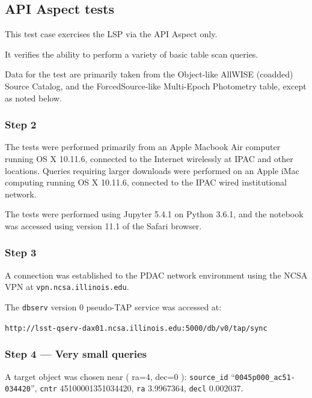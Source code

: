 
\subsection{API Aspect tests}

This test case exercises the LSP via the API Aspect only.

It verifies the ability to perform a variety of basic table scan queries.

Data for the test are primarily taken from the Object-like AllWISE (coadded) Source Catalog,
and the ForcedSource-like Multi-Epoch Photometry table,
except as noted below.

\subsubsection{Step 2}

The tests were performed primarily from an Apple Macbook Air computer running OS X 10.11.6,
connected to the Internet wirelessly at IPAC and other locations.
Queries requiring larger downloads were performed on an Apple iMac computing running OS X 10.11.6,
connected to the IPAC wired institutional network.

The tests were performed using Jupyter 5.4.1 on Python 3.6.1, and the notebook was accessed using version 11.1 of the Safari browser.

\subsubsection{Step 3}

A connection was established to the PDAC network environment using the NCSA VPN at \texttt{vpn.ncsa.illinois.edu}.

The \verb|dbserv| version 0 pseudo-TAP service was accessed at:

\begin{center}
\texttt{http://lsst-qserv-dax01.ncsa.illinois.edu:5000/db/v0/tap/sync}
\end{center}

\subsubsection{Step 4 --- Very small queries}

A target object was chosen near ( ra=4, dec=0 ):
\verb|source_id| ``\verb|0045p000_ac51-034420|'', \verb|cntr| 45100001351034420, \verb|ra| 3.9967364, \verb|decl| 0.002037.

